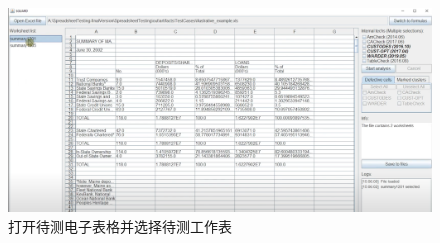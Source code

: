 \begin{figure}[tbp]    
    \centering
    \includegraphics[width=\textwidth]{figure/sg/sguard-3.png}
    \caption{打开待测电子表格并选择待测工作表}
    \label{figure-sg3}
\end{figure}